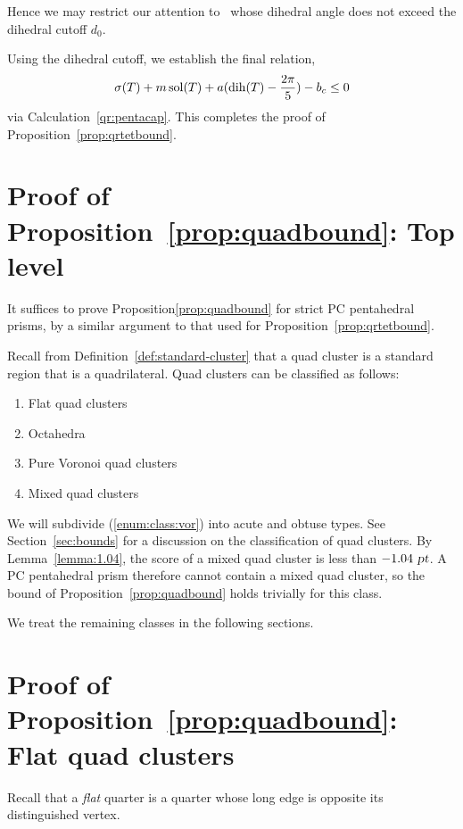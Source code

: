 Hence we may restrict our attention to \qrtets\ whose
dihedral angle does not exceed the dihedral cutoff $d_0$.

Using the dihedral cutoff, we establish the final relation,
\[\operatorname{\sigma}(T) + m \operatorname{sol}(T) + a (\operatorname{dih}(T) - \frac{2 \pi}{5}) - b_c \le 0\]
via Calculation~\ref{qr:pentacap}.  This completes the proof of Proposition~\ref{prop:qrtetbound}.

\section{Proof of Proposition~\ref{prop:quadbound}: Top level}

 It suffices to prove
 Proposition\ref{prop:quadbound} for strict PC pentahedral prisms,
 by a similar argument to that used for Proposition~\ref{prop:qrtetbound}.

Recall from Definition~\ref{def:standard-cluster}\tomcite{}
that a quad cluster is
a standard region that is a quadrilateral.
Quad clusters can be classified as follows:

\begin{enumerate}
 \item Flat quad clusters \label{enum:class:flat}
 \item Octahedra \label{enum:class:octa}
 \item Pure Voronoi quad clusters \label{enum:class:vor}
 \item Mixed quad clusters \label{enum:class:mixed}
\end{enumerate}

We will subdivide (\ref{enum:class:vor}) into acute and obtuse types.
See Section~\ref{sec:bounds}\tomcite{} %
for a discussion on the classification of quad clusters.
By Lemma~\ref{lemma:1.04}\tomcite{}, the score of a mixed quad
cluster is less than $-1.04 \text{ \sl pt}$. A PC pentahedral prism
therefore cannot contain a mixed quad cluster, so the bound of
Proposition~\ref{prop:quadbound} holds trivially for this class.

We treat the remaining classes in the following sections.

\section{Proof of Proposition~\ref{prop:quadbound}: Flat quad clusters}

Recall that a {\em flat} quarter is a quarter whose long edge is opposite its distinguished vertex.

